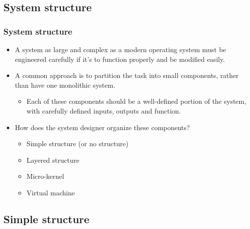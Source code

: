 \documentclass[CJKutf8,xcolor=pdftex,dvipsnames,table]{beamer}
\begin{document}
\begin{CJK*}{UTF8}{song}
  \section{System structure}
  \fi


  \begin{frame}
    \frametitle{System structure} \pause
    \begin{itemize}
    \item{A system as large and complex as a modern operating system must be engineered carefully if it's to function properly and be modified easily.} \pause
    \item{A common approach is to partition the task into small components, rather than have one monolithic system.} \pause
      \begin{itemize}
      \item{Each of these components should be a well-defined portion of the system, with carefully defined inputs, outputs and function.} \pause
      \end{itemize}
    \item{How does the system designer organize these components?} \pause
      \begin{itemize}
      \item{Simple structure (or no structure)} \pause
      \item{Layered structure} \pause
      \item{Micro-kernel} \pause
      \item{Virtual machine}
      \end{itemize}
    \end{itemize}
  \end{frame}

  \subsection{Simple structure}


\end{CJK*}
\end{document}

